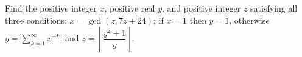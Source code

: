 Find the positive integer $x$, positive real $y$, and positive integer $z$ satisfying all three conditions: $x=\gcd(z,7z+24)$; if $x=1$ then $y=1$, otherwise $y=\sum_{k=1}^{\infty}x^{-k}$; and $z=\left\lfloor\dfrac{y^2+1}{y}\right\rfloor$.
